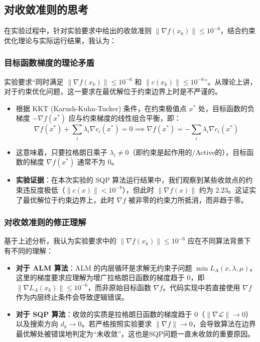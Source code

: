 \documentclass[a4paper,12pt]{article}
\begin{document}
\subsection{对收敛准则的思考}
在实验过程中，针对实验要求中给出的收敛准则 $\|\nabla f(x_k)\| \le 10^{-6}$，结合约束优化理论与实际运行结果，我认为：

\subsubsection{目标函数梯度的理论矛盾}
实验要求“同时满足 $\|\nabla f(x_k)\| \le 10^{-6}$ 和 $\|c(x_k)\| \le 10^{-6}$”。从理论上讲，对于约束优化问题，这一要求在最优解位于约束边界上时是不严谨的。
\begin{itemize}
    \item 根据 KKT (Karush-Kuhn-Tucker) 条件，在约束极值点 $x^*$ 处，目标函数的负梯度 $-\nabla f(x^*)$ 应与约束梯度的线性组合平衡，即：
    \begin{equation}
        \nabla f(x^*) + \sum_{i} \lambda_i \nabla c_i(x^*) = 0 \implies \nabla f(x^*) = - \sum_{i} \lambda_i \nabla c_i(x^*)
    \end{equation}
    \item 这意味着，只要拉格朗日乘子 $\lambda_i \neq 0$（即约束是起作用的/Active的），目标函数的梯度 $\nabla f(x^*)$ 通常不为 0。
    \item \textbf{实验证据}：在本次实验的 SQP 算法运行结果中，我们观察到某些收敛点的约束违反度极低（$\|c(x)\| < 10^{-8}$），但此时 $\|\nabla f(x)\|$ 约为 $2.23$。这证实了最优解位于约束边界上，此时 $\nabla f$ 被非零的约束力所抵消，而非趋于零。
\end{itemize}

\subsubsection{对收敛准则的修正理解}
基于上述分析，我认为实验要求中的 $\|\nabla f(x_k)\| \le 10^{-6}$ 应在不同算法背景下有不同的理解：
\begin{itemize}
    \item \textbf{对于 ALM 算法}：ALM 的内层循环是求解无约束子问题 $\min L_A(x, \lambda, \mu)$。这里的梯度要求应理解为增广拉格朗日函数的梯度趋于 0，即 $\|\nabla L_A(x_k)\| \le 10^{-6}$，而非原始目标函数 $\nabla f$。代码实现中若直接使用 $\nabla f$ 作为内层终止条件会导致逻辑错误。
    \item \textbf{对于 SQP 算法}：收敛的实质是拉格朗日函数的梯度趋于 0（$\|\nabla \mathcal{L}\| \to 0$）以及搜索方向 $d_k \to 0$。若严格按照实验要求 $\|\nabla f\| \to 0$，会导致算法在边界最优解处被错误地判定为“未收敛”，这也是SQP问题一直未收敛的重要原因。
\end{itemize}
\end{document}
